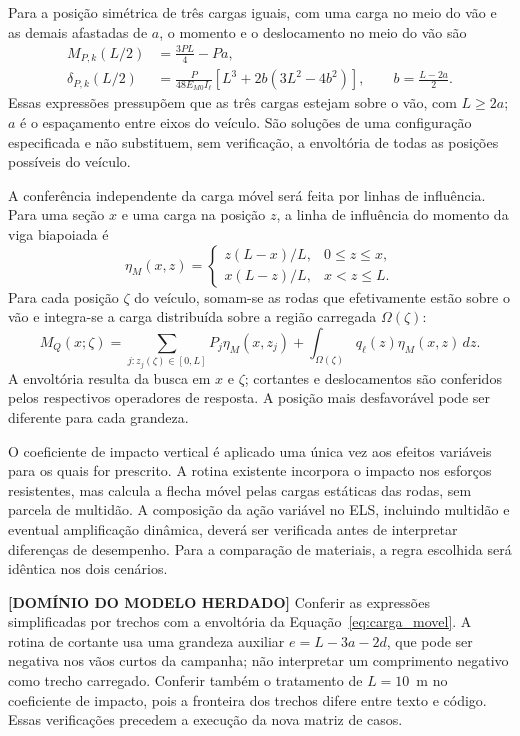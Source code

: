Para a posição simétrica de três cargas iguais, com uma carga no meio do vão e as demais afastadas de $a$, o momento e o deslocamento no meio do vão são
\begin{align}
 M_{P,k}(L/2)&=\frac{3PL}{4}-Pa,\label{eq:momento_tres_rodas}\\
 \delta_{P,k}(L/2)&=\frac{P}{48E_{M0}I_\ell}
 \left[L^3+2b(3L^2-4b^2)\right],\qquad b=\frac{L-2a}{2}.
\label{eq:flecha_tres_rodas}
\end{align}
Essas expressões pressupõem que as três cargas estejam sobre o vão, com $L\geq2a$; $a$ é o espaçamento entre eixos do veículo. São soluções de uma configuração especificada e não substituem, sem verificação, a envoltória de todas as posições possíveis do veículo.

A conferência independente da carga móvel será feita por linhas de influência. Para uma seção $x$ e uma carga na posição $z$, a linha de influência do momento da viga biapoiada é
\begin{equation}
 \eta_M(x,z)=
 \begin{cases}
 z(L-x)/L,&0\leq z\leq x,\\
 x(L-z)/L,&x<z\leq L.
 \end{cases}
\label{eq:linha_influencia}
\end{equation}
Para cada posição $\zeta$ do veículo, somam-se as rodas que efetivamente estão sobre o vão e integra-se a carga distribuída sobre a região carregada $\Omega(\zeta)$:
\begin{equation}
 M_Q(x;\zeta)=\sum_{j:z_j(\zeta)\in[0,L]}P_j\eta_M(x,z_j)
 +\int_{\Omega(\zeta)}q_\ell(z)\eta_M(x,z)\,dz.
\label{eq:carga_movel}
\end{equation}
A envoltória resulta da busca em $x$ e $\zeta$; cortantes e deslocamentos são conferidos pelos respectivos operadores de resposta. A posição mais desfavorável pode ser diferente para cada grandeza.

O coeficiente de impacto vertical é aplicado uma única vez aos efeitos variáveis para os quais for prescrito. A rotina existente incorpora o impacto nos esforços resistentes, mas calcula a flecha móvel pelas cargas estáticas das rodas, sem parcela de multidão. A composição da ação variável no ELS, incluindo multidão e eventual amplificação dinâmica, deverá ser verificada antes de interpretar diferenças de desempenho. Para a comparação de materiais, a regra escolhida será idêntica nos dois cenários.

\begin{fillblock}
\noindent\textbf{[DOMÍNIO DO MODELO HERDADO]} Conferir as expressões simplificadas por trechos com a envoltória da Equação~\ref{eq:carga_movel}. A rotina de cortante usa uma grandeza auxiliar $e=L-3a-2d$, que pode ser negativa nos vãos curtos da campanha; não interpretar um comprimento negativo como trecho carregado. Conferir também o tratamento de $L=10$~m no coeficiente de impacto, pois a fronteira dos trechos difere entre texto e código. Essas verificações precedem a execução da nova matriz de casos.
\end{fillblock}

